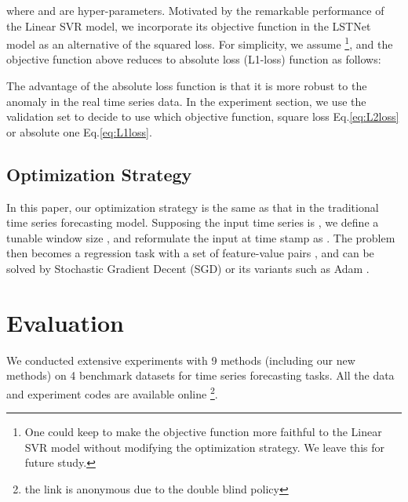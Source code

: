 \documentclass[sigconf]{acmart}
\begin{document}
where  and  are hyper-parameters. Motivated by the remarkable performance of the Linear SVR model, we incorporate its objective function in the LSTNet model as an alternative of the squared loss. For simplicity, we assume \footnote{One could keep  to make the objective function more faithful to the Linear SVR model without modifying the optimization strategy. We leave this for future study.}, and the objective function above reduces to absolute loss (L1-loss) function as follows:


The advantage of the absolute loss function is that it is more robust to the anomaly in the real time series data. In the experiment section, we use the validation set to decide to use which objective function, square loss Eq.\ref{eq:L2loss} or absolute one Eq.\ref{eq:L1loss}.

\subsection{Optimization Strategy}
\label{sec:train}
\iffalse
For a time series sequence, the most straightforward training strategy is to treat the problem as a supervision task with an input time series signals and an output time series signals. Its advantage lies in efficient computation, which allows for going though the neural network part one time at each iteration. But the defect is that we only have one training sample. That being said, we cannot apply stochastic gradient decent (SGD) method. Given the highly non-convex nature of neural network objective function, this strategy can easily lead to bad performance, which is stick at the bad local minimal. 
\fi
In this paper, our optimization strategy is the same as that in the traditional time series forecasting model. Supposing the input time series is , we define a tunable window size , and reformulate the input at time stamp  as . The problem then becomes a regression task with a set of feature-value pairs , and can be solved by Stochastic Gradient Decent (SGD) or its variants such as Adam \cite{kingma2014adam}.


 \section{Evaluation}
\label{sec:experiment}



We conducted extensive experiments with 9 methods (including our new methods) on 4 benchmark datasets for time series forecasting tasks. All the data and experiment codes are available online \footnote{the link is anonymous due to the double blind policy}. 
\end{document}

